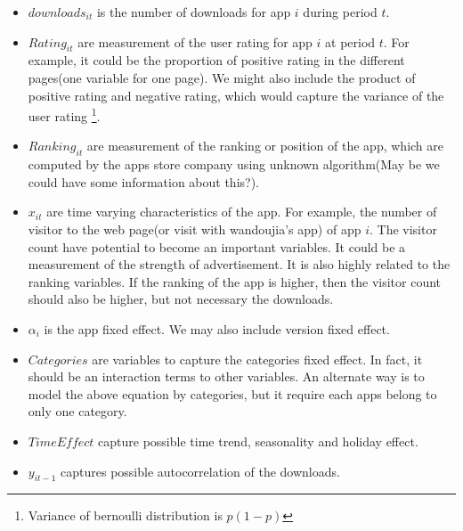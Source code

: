 \documentclass[11pt,twoside]{article}
\begin{document}
\begin{itemize}
	\item $downloads_{it}$ is the number of downloads for app $i$ during period $t$.
	\item $Rating_{it}$ are measurement of the user rating for app $i$ at period $t$. For example, it could be the proportion of positive rating in the different pages(one variable for one page). We might also include the product of positive rating and negative rating, which would capture the variance of the user rating \footnote{Variance of bernoulli distribution is $p(1-p)$}. 
	\item $Ranking_{it}$ are measurement of the ranking or position of the app, which are computed by the apps store company using unknown algorithm(May be we could have some information about this?). 
	\item $x_{it}$ are time varying characteristics of the app. For example, the number of visitor to the web page(or visit with wandoujia's app) of app $i$. The visitor count have potential to become an important variables. It could be a measurement of the strength of advertisement. It is also highly related to the ranking variables. If the ranking of the app is higher, then the visitor count should also be higher, but not necessary the downloads. 
	\item $\alpha_i$ is the app fixed effect. We may also include version fixed effect.
	\item $Categories$ are variables to capture the categories fixed effect. In fact, it should be an interaction terms to other variables. An alternate way is to model the above equation by categories, but it require each apps belong to only one category.
	\item $TimeEffect$ capture possible time trend, seasonality and holiday effect. 
	\item $y_{it-1}$ captures possible autocorrelation of the downloads. 
\end{itemize}
\end{document}
